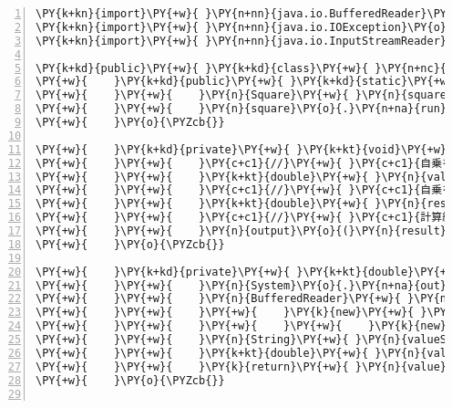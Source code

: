 \begin{Verbatim}[commandchars=\\\{\},numbers=left,firstnumber=1,stepnumber=1,frame=single,fontsize=\small]
\PY{k+kn}{import}\PY{+w}{ }\PY{n+nn}{java.io.BufferedReader}\PY{o}{;}
\PY{k+kn}{import}\PY{+w}{ }\PY{n+nn}{java.io.IOException}\PY{o}{;}
\PY{k+kn}{import}\PY{+w}{ }\PY{n+nn}{java.io.InputStreamReader}\PY{o}{;}

\PY{k+kd}{public}\PY{+w}{ }\PY{k+kd}{class}\PY{+w}{ }\PY{n+nc}{Square}\PY{+w}{ }\PY{o}{\PYZob{}}
\PY{+w}{    }\PY{k+kd}{public}\PY{+w}{ }\PY{k+kd}{static}\PY{+w}{ }\PY{k+kt}{void}\PY{+w}{ }\PY{n+nf}{main}\PY{o}{(}\PY{n}{String}\PY{o}{[}\PY{o}{]}\PY{+w}{ }\PY{n}{args}\PY{o}{)}\PY{+w}{ }\PY{k+kd}{throws}\PY{+w}{ }\PY{n}{Exception}\PY{+w}{ }\PY{o}{\PYZob{}}
\PY{+w}{    }\PY{+w}{    }\PY{n}{Square}\PY{+w}{ }\PY{n}{square}\PY{+w}{ }\PY{o}{=}\PY{+w}{ }\PY{k}{new}\PY{+w}{ }\PY{n}{Square}\PY{o}{(}\PY{o}{)}\PY{o}{;}
\PY{+w}{    }\PY{+w}{    }\PY{n}{square}\PY{o}{.}\PY{n+na}{run}\PY{o}{(}\PY{o}{)}\PY{o}{;}
\PY{+w}{    }\PY{o}{\PYZcb{}}

\PY{+w}{    }\PY{k+kd}{private}\PY{+w}{ }\PY{k+kt}{void}\PY{+w}{ }\PY{n+nf}{run}\PY{o}{(}\PY{o}{)}\PY{+w}{ }\PY{k+kd}{throws}\PY{+w}{ }\PY{n}{Exception}\PY{+w}{ }\PY{o}{\PYZob{}}
\PY{+w}{    }\PY{+w}{    }\PY{c+c1}{//}\PY{+w}{ }\PY{c+c1}{自乗を計算する値を入力する}
\PY{+w}{    }\PY{+w}{    }\PY{k+kt}{double}\PY{+w}{ }\PY{n}{value}\PY{+w}{ }\PY{o}{=}\PY{+w}{ }\PY{n}{input}\PY{o}{(}\PY{o}{)}\PY{o}{;}
\PY{+w}{    }\PY{+w}{    }\PY{c+c1}{//}\PY{+w}{ }\PY{c+c1}{自乗を計算する}
\PY{+w}{    }\PY{+w}{    }\PY{k+kt}{double}\PY{+w}{ }\PY{n}{result}\PY{+w}{ }\PY{o}{=}\PY{+w}{ }\PY{n}{process}\PY{o}{(}\PY{n}{value}\PY{o}{)}\PY{o}{;}
\PY{+w}{    }\PY{+w}{    }\PY{c+c1}{//}\PY{+w}{ }\PY{c+c1}{計算結果を出力する}
\PY{+w}{    }\PY{+w}{    }\PY{n}{output}\PY{o}{(}\PY{n}{result}\PY{o}{)}\PY{o}{;}
\PY{+w}{    }\PY{o}{\PYZcb{}}

\PY{+w}{    }\PY{k+kd}{private}\PY{+w}{ }\PY{k+kt}{double}\PY{+w}{ }\PY{n+nf}{input}\PY{o}{(}\PY{o}{)}\PY{+w}{ }\PY{k+kd}{throws}\PY{+w}{ }\PY{n}{IOException}\PY{+w}{ }\PY{o}{\PYZob{}}
\PY{+w}{    }\PY{+w}{    }\PY{n}{System}\PY{o}{.}\PY{n+na}{out}\PY{o}{.}\PY{n+na}{print}\PY{o}{(}\PY{l+s}{"自乗を計算する値を入力してください："}\PY{o}{)}\PY{o}{;}
\PY{+w}{    }\PY{+w}{    }\PY{n}{BufferedReader}\PY{+w}{ }\PY{n}{reader}\PY{+w}{ }\PY{o}{=}
\PY{+w}{    }\PY{+w}{    }\PY{+w}{    }\PY{k}{new}\PY{+w}{ }\PY{n+nf}{BufferedReader}\PY{o}{(}
\PY{+w}{    }\PY{+w}{    }\PY{+w}{    }\PY{+w}{    }\PY{k}{new}\PY{+w}{ }\PY{n+nf}{InputStreamReader}\PY{o}{(}\PY{n}{System}\PY{o}{.}\PY{n+na}{in}\PY{o}{)}\PY{o}{)}\PY{o}{;}
\PY{+w}{    }\PY{+w}{    }\PY{n}{String}\PY{+w}{ }\PY{n}{valueString}\PY{+w}{ }\PY{o}{=}\PY{+w}{ }\PY{n}{reader}\PY{o}{.}\PY{n+na}{readLine}\PY{o}{(}\PY{o}{)}\PY{o}{;}
\PY{+w}{    }\PY{+w}{    }\PY{k+kt}{double}\PY{+w}{ }\PY{n}{value}\PY{+w}{ }\PY{o}{=}\PY{+w}{ }\PY{n}{Double}\PY{o}{.}\PY{n+na}{parseDouble}\PY{o}{(}\PY{n}{valueString}\PY{o}{)}\PY{o}{;}
\PY{+w}{    }\PY{+w}{    }\PY{k}{return}\PY{+w}{ }\PY{n}{value}\PY{o}{;}
\PY{+w}{    }\PY{o}{\PYZcb{}}


\end{Verbatim}
